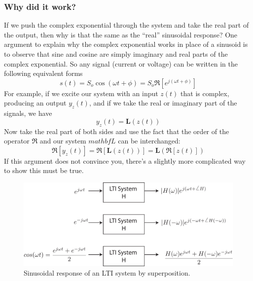 \subsubsection{Why did it work?}
If we push the complex exponential through the system and take the real part of the output, then why is that the same as the ``real'' sinusoidal response?  One argument to explain why the complex exponential works in place of a sinusoid is to observe that sine and cosine are simply imaginary and real parts of the complex exponential.  So any signal (current or voltage) can be written in the following equivalent forms
    \begin{equation}
        s(t) = S_o \cos(\omega t + \phi) = S_o \Re[e^{j(\omega t + \phi)}]
    \end{equation}
For example, if we excite our system with an input $z(t)$ that is complex, producing an output $y_z(t)$, and if we take the real or imaginary part of the signals, we have
    \begin{equation}
        y_z(t) = \mathbf{L}(z(t))
    \end{equation}
Now take the real part of both sides and use the fact that the order of the operator $\Re$ and our system $mathbf{L}$ can be interchanged:
    \begin{equation}
        \Re[y_z(t)] = \Re[\mathbf{L}(z(t))]  = \mathbf{L} (\Re[z(t)])
    \end{equation}
If this argument does not convince you, there's a slightly more complicated way to show this must be true.
\begin{figure}[tb]
\begin{center}
\includegraphics[width=.75\columnwidth]{lti_cosine}
\end{center}
\caption{Sinusoidal response of an LTI system by superposition. }
\label{fig:lti_cosine}
\end{figure}
